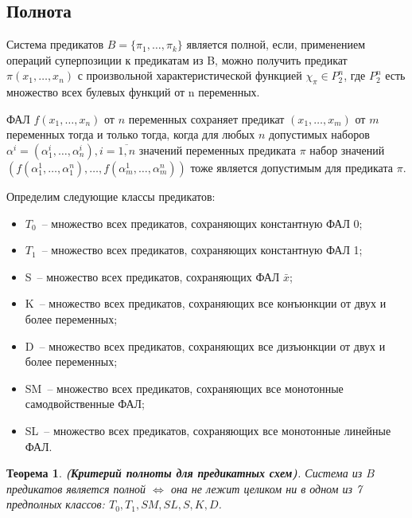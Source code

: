 \documentclass[12pt]{extarticle}
\newtheorem{theorem}{Теорема}[section]
\newenvironment{definition}[1][Определение.]{\begin{trivlist}
\item[\hskip \labelsep {\bfseries #1}]}{\end{trivlist}}
\begin{document}
\subsection{Полнота}

\begin{definition}
Система предикатов $B = \{ \pi_1, \dots, \pi_k \}$ является полной, если, 
применением операций суперпозиции к предикатам из B, можно получить 
предикат $\pi(x_1, \dots, x_n)$ с произвольной характеристической 
функцией $\chi_{\pi} \in P_2^n$, где $P_2^n$ есть множество всех булевых функций от n переменных.
\end{definition}

\begin{definition} ФАЛ
$f (x_1, \ldots, x_n)$ от $n$ переменных сохраняет предикат $ (x_1, \ldots, x_m)$ от $m$
переменных тогда и только тогда, когда для любых $n$ допустимых наборов $\alpha^i = (\alpha_1^i, \ldots, \alpha_n^i), 
i = \overline{1, n}$ значений переменных предиката $\pi$ набор
значений $( f(\alpha_1^1, \ldots, \alpha_1^n), \ldots, f(\alpha_m^1, \ldots, \alpha_m^n) )$
тоже является допустимым для предиката $\pi$.
\end{definition}

Определим следующие классы предикатов:
\begin{itemize}
    \item{$T_0$}~-- множество всех предикатов, сохраняющих константную ФАЛ 0;
    \item{$T_1$}~-- множество всех предикатов, сохраняющих константную ФАЛ 1;
    \item{S}~-- множество всех предикатов, сохраняющих ФАЛ $\bar{x}$;
    \item{K}~-- множество всех предикатов, сохраняющих все конъюнкции от двух и более переменных;
    \item{D}~-- множество всех предикатов, сохраняющих все дизъюнкции от двух и более переменных;
    \item{SM}~-- множество всех предикатов, сохраняющих все монотонные самодвойственные ФАЛ;
    \item{SL}~-- множество всех предикатов, сохраняющих все монотонные линейные ФАЛ.
\end{itemize}

\begin{theorem}
\label{Post}
\textbf{(Критерий полноты для предикатных схем)}. Система из $B$ предикатов является полной $\iff$
она не лежит целиком ни в одном из 7 предполных классов: $T_0, T_1, SM, SL, S, K, D$. \cite{Shu11} 
\end{theorem}
\end{document}
